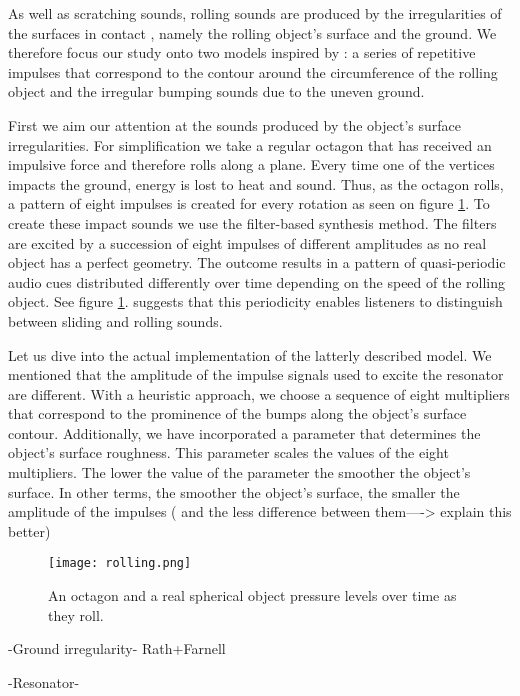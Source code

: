 As well as scratching sounds, rolling sounds are produced by the irregularities of the surfaces in contact \cite{van2001foleyautomatic}, namely the rolling object's surface and the ground. We therefore focus our study onto two models inspired by \cite{farnell2010designing}: a series of repetitive impulses that correspond to the contour around the circumference of the rolling object and the irregular bumping sounds due to the uneven ground.

First we aim our attention at the sounds produced by the object's surface irregularities. For simplification we take a regular octagon that has received an impulsive force and therefore rolls along a plane. Every time one of the vertices impacts the ground, energy is lost to heat and sound. Thus, as the octagon rolls, a pattern of eight impulses is created for every rotation as seen on figure \ref{fig:rolling}. To create these impact sounds we use the filter-based synthesis method. The filters are excited by a succession of eight impulses of different amplitudes as no real object has a perfect geometry. The outcome results in a pattern of quasi-periodic audio cues distributed differently over time depending on the speed of the rolling object. See figure \ref{fig:rolling}. \cite{houben1999auditory} suggests that this periodicity  enables listeners to distinguish between sliding and rolling sounds.

Let us dive into the actual implementation of the latterly described model. We mentioned that the amplitude of the impulse signals used to excite the resonator are different. With a heuristic approach, we choose a sequence of eight multipliers that correspond to the prominence of the bumps along the object's surface contour. Additionally, we have incorporated a parameter that determines the object's surface roughness. This parameter scales the values of the eight multipliers. The lower the value of the parameter the smoother the object's surface. In other terms, the smoother the object's surface, the smaller the amplitude of the impulses ( and the less difference  between them----> explain this better)
\begin{figure}[H]
  \centering
    \texttt{[image: rolling.png]}
      \caption{An octagon and a real spherical object pressure levels over time as they roll.}
      \label{fig:rolling}
\end{figure} 

-Ground irregularity-
Rath+Farnell

-Resonator-

